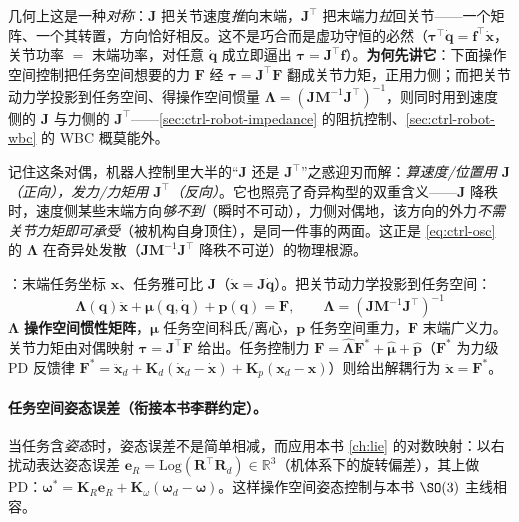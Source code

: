 \noindent 几何上这是一种\emph{对称}：$\mathbf J$ 把关节速度\emph{推}向末端，$\mathbf J^\top$ 把末端力\emph{拉}回关节——一个矩阵、一个其转置，方向恰好相反。这不是巧合而是虚功守恒的必然（$\boldsymbol\tau^\top\dot{\mathbf q}=\mathbf f^\top\dot{\mathbf x}$，关节功率 $=$ 末端功率，对任意 $\dot{\mathbf q}$ 成立即逼出 $\boldsymbol\tau=\mathbf J^\top\mathbf f$）\cite{lynch2017modern,craig2005introduction}。\textbf{为何先讲它}：下面操作空间控制把任务空间想要的力 $\mathbf F$ 经 $\boldsymbol\tau=\mathbf J^\top\mathbf F$ 翻成关节力矩，正用力侧；而把关节动力学投影到任务空间、得操作空间惯量 $\boldsymbol\Lambda=(\mathbf J\mathbf M^{-1}\mathbf J^\top)^{-1}$，则同时用到速度侧的 $\mathbf J$ 与力侧的 $\mathbf J^\top$——\cref{sec:ctrl-robot-impedance} 的阻抗控制、\cref{sec:ctrl-robot-wbc} 的 WBC 概莫能外。

\begin{insight}
记住这条对偶，机器人控制里大半的“$\mathbf J$ 还是 $\mathbf J^\top$”之惑迎刃而解：\emph{算速度/位置用 $\mathbf J$（正向），发力/力矩用 $\mathbf J^\top$（反向）}。它也照亮了奇异构型的双重含义——$\mathbf J$ 降秩时，速度侧某些末端方向\emph{够不到}（瞬时不可动），力侧对偶地，该方向的外力\emph{不需关节力矩即可承受}（被机构自身顶住），是同一件事的两面。这正是 \cref{eq:ctrl-osc} 的 $\boldsymbol\Lambda$ 在奇异处发散（$\mathbf J\mathbf M^{-1}\mathbf J^\top$ 降秩不可逆）的物理根源。
\end{insight}

：末端任务坐标 $\mathbf{x}$、任务雅可比 $\mathbf{J}$（$\dot{\mathbf{x}}=\mathbf{J}\dot{\mathbf{q}}$）。把关节动力学投影到任务空间：
\begin{equation}
  \boldsymbol{\Lambda}(\mathbf{q})\ddot{\mathbf{x}}+\boldsymbol{\mu}(\mathbf{q},\dot{\mathbf{q}})+\mathbf{p}(\mathbf{q})=\mathbf{F},\qquad
  \boxed{\boldsymbol{\Lambda}=(\mathbf{J}\mathbf{M}^{-1}\mathbf{J}^\top)^{-1}}
  \label{eq:ctrl-osc}
\end{equation}
$\boldsymbol{\Lambda}$ \textbf{操作空间惯性矩阵}，$\boldsymbol{\mu}$ 任务空间科氏/离心，$\mathbf{p}$ 任务空间重力，$\mathbf{F}$ 末端广义力。关节力矩由对偶映射 $\boldsymbol{\tau}=\mathbf{J}^\top\mathbf{F}$ 给出。任务控制力 $\mathbf{F}=\hat{\boldsymbol{\Lambda}}\mathbf{F}^*+\hat{\boldsymbol{\mu}}+\hat{\mathbf{p}}$（$\mathbf{F}^*$ 为力级 PD 反馈律 $\mathbf{F}^*=\ddot{\mathbf{x}}_d+\mathbf{K}_d(\dot{\mathbf{x}}_d-\dot{\mathbf{x}})+\mathbf{K}_p(\mathbf{x}_d-\mathbf{x})$）则给出解耦行为 $\ddot{\mathbf{x}}=\mathbf{F}^*$。

\paragraph{任务空间姿态误差（衔接本书李群约定）。}
当任务含\emph{姿态}时，姿态误差不是简单相减，而应用本书 \cref{ch:lie} 的对数映射：以右扰动表达姿态误差 $\mathbf{e}_R=\mathrm{Log}(\mathbf{R}^\top\mathbf{R}_d)\in\mathbb{R}^3$（机体系下的旋转偏差），其上做 PD：$\boldsymbol{\omega}^*=\mathbf{K}_R\mathbf{e}_R+\mathbf{K}_\omega(\boldsymbol{\omega}_d-\boldsymbol{\omega})$。这样操作空间姿态控制与本书 $\SO(3)$ 主线相容。

